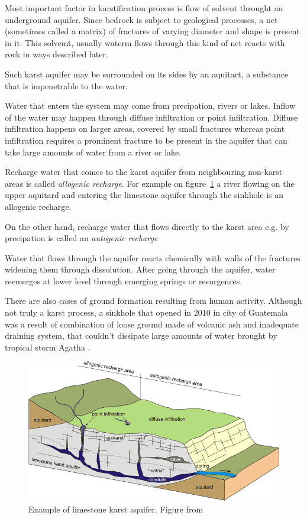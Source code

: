 Most important factor in karstification process is flow of solvent throught an
underground aquifer. Since bedrock is subject to geological processes, a
net (sometimes called a matrix) of fractures of varying diameter and shape is
present in it. This solvemt, usually waterm flows through this kind of net
reacts with rock in ways described later.

Such karst aquifer may be surrounded on its sides by an aquitart, a substance
that is impenetrable to the water.

Water that enters the system may come from precipation, rivers or lakes. Inflow
of the water may happen through diffuse infiltration or point infiltration.
Diffuse infiltration happens on larger areas, covered by small fractures whereas
point infiltration requires a prominent fracture to be present in the aquifer
that can take large amounts of water from a river or lake.

Recharge water that comes to the karst aquifer from neighbouring non-karst areas
is called \emph{allogenic recharge}. For example on figure~\ref{fig:karstification}
a river flowing on the upper aquitard and entering the limestone aquifer through
the sinkhole is an allogenic recharge.

On the other hand, recharge water that flows directly to the karst area e.g. by
precipation is called an \emph{autogenic recharge}

Water that flows through the aquifer reacts chemically with walls of the
fractures widening them through dissolution. After going through the aquifer,
water reemerges at lower level through emerging springs or resurgences.

There are also cases of ground formation resulting from human activity.
Although not truly a karst process, a sinkhole that opened in 2010 in city of
Guatemala was a result of combination of loose ground made of volcanic ash and
inadequate draining system, that couldn't dissipate large amounts of water
brought by tropical storm Agatha \parencite{times2010}.

\begin{figure}
  \centerline{\includegraphics[width=\textwidth]{chapters/karstification/karstification.png}}
  \caption{Example of limestone karst aquifer.
    Figure from \cite{golscheider2007methods}}
  \label{fig:karstification}
\end{figure}

